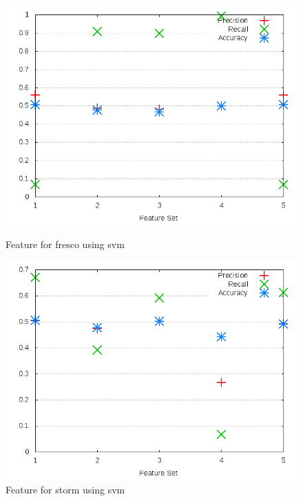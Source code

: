 \begin{figure}[h]
    \centering

    \begin{minipage}[b]{0.45\linewidth}
        \includegraphics[width=1.0\textwidth]{images/svm/test_3/fresco_sample_range}
        \caption{Feature for fresco using \gls{svm}}
        \label{fig:test_3_fresco_svm}
    \end{minipage}
\quad
    \begin{minipage}[b]{0.45\linewidth}
        \includegraphics[width=1.0\textwidth]{images/svm/test_3/storm_sample_range}
        \caption{Feature for storm using \gls{svm}}
        \label{fig:test_3_storm_svm}
    \end{minipage}
\end{figure}

